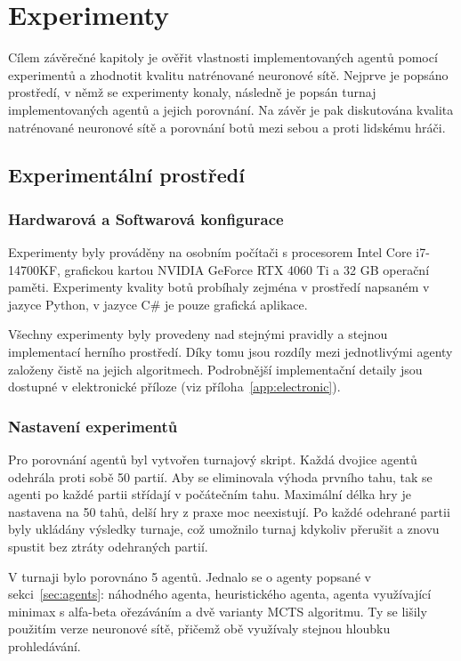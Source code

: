 \chapter{Experimenty}

Cílem závěrečné kapitoly je ověřit vlastnosti implementovaných agentů pomocí experimentů a zhodnotit kvalitu natrénované
neuronové sítě. Nejprve je popsáno prostředí, v němž se experimenty konaly, následně je popsán turnaj implementovaných
agentů a jejich porovnání. Na závěr je pak diskutována kvalita natrénované neuronové sítě a porovnání botů mezi sebou
a proti lidskému hráči.

\section{Experimentální prostředí}

\subsection{Hardwarová a Softwarová konfigurace}

Experimenty byly prováděny na osobním počítači s procesorem Intel Core i7-14700KF, grafickou kartou NVIDIA GeForce RTX 4060 Ti a 32 GB operační paměti.
Experimenty kvality botů probíhaly zejména v prostředí napsaném v jazyce Python, v jazyce C\# je pouze grafická aplikace.

Všechny experimenty byly provedeny nad stejnými pravidly a stejnou implementací herního prostředí. Díky tomu jsou
rozdíly mezi jednotlivými agenty založeny čistě na jejich algoritmech. Podrobnější implementační detaily jsou dostupné 
v elektronické příloze (viz příloha~\ref{app:electronic}).

\subsection{Nastavení experimentů}

Pro porovnání agentů byl vytvořen turnajový skript. Každá dvojice agentů odehrála proti sobě 50 partií. Aby se eliminovala
výhoda prvního tahu, tak se agenti po každé partii střídají v počátečním tahu. Maximální délka hry je nastavena na 50 tahů,
delší hry z praxe moc neexistují. Po každé odehrané partii byly ukládány výsledky turnaje, což umožnilo turnaj kdykoliv
přerušit a znovu spustit bez ztráty odehraných partií.

V turnaji bylo porovnáno 5 agentů. Jednalo se o agenty popsané v sekci~\ref{sec:agents}: náhodného agenta, heuristického agenta,
agenta využívající minimax s alfa-beta ořezáváním a dvě varianty MCTS algoritmu. Ty se lišily použitím verze neuronové sítě, 
přičemž obě využívaly stejnou hloubku prohledávání.

